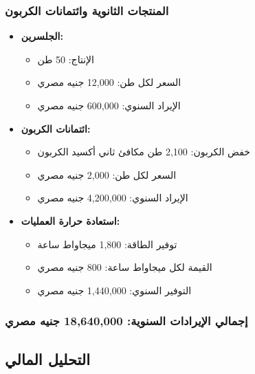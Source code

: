 \subsubsection{المنتجات الثانوية وائتمانات الكربون}
\begin{itemize}
    \item \textbf{الجلسرين:}
    \begin{itemize}
        \item الإنتاج: 50 طن
        \item السعر لكل طن: 12,000 جنيه مصري
        \item الإيراد السنوي: 600,000 جنيه مصري
    \end{itemize}
    
    \item \textbf{ائتمانات الكربون:}
    \begin{itemize}
        \item خفض الكربون: 2,100 طن مكافئ ثاني أكسيد الكربون
        \item السعر لكل طن: 2,000 جنيه مصري
        \item الإيراد السنوي: 4,200,000 جنيه مصري
    \end{itemize}
    
    \item \textbf{استعادة حرارة العمليات:}
    \begin{itemize}
        \item توفير الطاقة: 1,800 ميجاواط ساعة
        \item القيمة لكل ميجاواط ساعة: 800 جنيه مصري
        \item التوفير السنوي: 1,440,000 جنيه مصري
    \end{itemize}
\end{itemize}

\subsubsection{إجمالي الإيرادات السنوية: 18,640,000 جنيه مصري}

\subsection{التحليل المالي}

